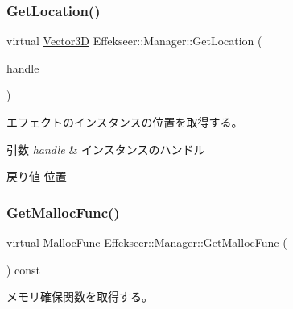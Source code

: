 \subsubsection{\texorpdfstring{Get\+Location()}{GetLocation()}}
{\footnotesize\ttfamily virtual \mbox{\hyperlink{struct_effekseer_1_1_vector3_d}{Vector3D}} Effekseer\+::\+Manager\+::\+Get\+Location (\begin{DoxyParamCaption}\item[{\mbox{\hyperlink{namespace_effekseer_afba58b8d812da862190e9bbfc040824a}{Handle}}}]{handle }\end{DoxyParamCaption})\hspace{0.3cm}{\ttfamily [pure virtual]}}



エフェクトのインスタンスの位置を取得する。 


\begin{DoxyParams}{引数}
{\em handle} & インスタンスのハンドル \\
\hline
\end{DoxyParams}
\begin{DoxyReturn}{戻り値}
位置 
\end{DoxyReturn}
\mbox{\label{class_effekseer_1_1_manager_aacbf3bb08982ff3b7fd3c5685b88c286}} 
\subsubsection{\texorpdfstring{Get\+Malloc\+Func()}{GetMallocFunc()}}
{\footnotesize\ttfamily virtual \mbox{\hyperlink{namespace_effekseer_a2f9a04a7b2d08a8f2173ce47e57ff742}{Malloc\+Func}} Effekseer\+::\+Manager\+::\+Get\+Malloc\+Func (\begin{DoxyParamCaption}{ }\end{DoxyParamCaption}) const\hspace{0.3cm}{\ttfamily [pure virtual]}}



メモリ確保関数を取得する。 

\mbox{\label{class_effekseer_1_1_manager_abd550c1abf3f8b324ba9a5f71a735ff8}} 

